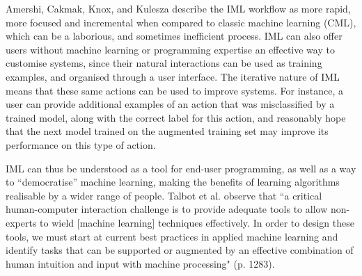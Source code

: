 \documentclass[letterpaper]{article}
\begin{document}
Amershi, Cakmak, Knox, and Kulesza \citeyear{amershi2014power} describe the IML workflow as more rapid, more focused and incremental when compared to classic machine learning (CML), which can be a laborious, and sometimes inefficient process. IML can also offer users without machine learning or programming expertise an effective way to customise systems, since their natural interactions can be used as training examples, and organised through a user interface. The iterative nature of IML means that these same actions can be used to improve systems. For instance, a user can provide additional examples of an action that was misclassified by a trained model, along with the correct label for this action, and reasonably hope that the next model trained on the augmented training set may improve its performance on this type of action. 

IML can thus be understood as a tool for end-user programming, as well as a way to ``democratise'' machine learning, making the benefits of learning algorithms realisable by a wider range of people. Talbot et al. observe that ``a critical human-computer interaction challenge is to provide adequate tools to allow non-experts to wield [machine learning] techniques effectively. In order to design these tools, we must start at current best practices in applied machine learning and identify tasks that can be supported or augmented by an effective combination of human intuition and input with machine processing" (p. 1283).%


\end{document}
